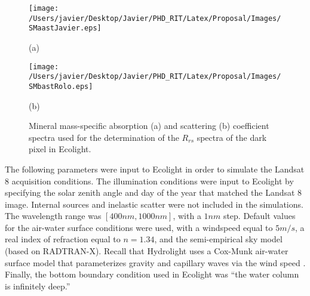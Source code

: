 \documentclass[onecolumn,3p]{elsarticle}
\begin{document}
\begin{figure}[!ht]
	\begin{minipage}[c]{0.48\linewidth}
  		\centering
  		\texttt{[image: /Users/javier/Desktop/Javier/PHD\_RIT/Latex/Proposal/Images/SMaastJavier.eps]}
	  	\centerline{(a)}\medskip
  	\end{minipage}  
  	\hfill
  	\begin{minipage}[c]{0.48\linewidth}
  		\centering
  		\texttt{[image: /Users/javier/Desktop/Javier/PHD\_RIT/Latex/Proposal/Images/SMbastRolo.eps]}
  		\centerline{(b)}\medskip
  	\end{minipage}
  	\caption{Mineral mass-specific absorption (a) and scattering (b) coefficient spectra used for the determination of the $R_{rs}$ spectra of the dark pixel in Ecolight. \label{fig:SMcoef} }
\end{figure}

The following parameters were input to Ecolight in order to simulate the Landsat 8 acquisition conditions. The illumination conditions were input to Ecolight by specifying the solar zenith angle and day of the year that matched the Landsat 8 image. Internal sources and inelastic scatter were not included in the simulations. The wavelength range was $[400nm,1000nm]$, with a $1nm$ step. Default values for the air-water surface conditions were used, with a windspeed equal to $5m/s$, a real index of refraction equal to $n=1.34$, and the semi-empirical sky model (based on RADTRAN-X). Recall that Hydrolight uses a Cox-Munk air-water surface model that parameterizes gravity and capillary waves via the wind speed . Finally, the bottom boundary condition used in Ecolight was ``the water column is infinitely deep.''
\end{document}
